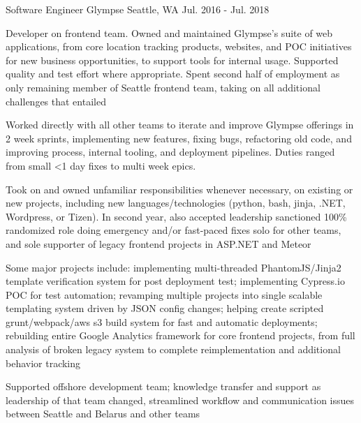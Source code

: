 \begin{cventries}
\cventry
{Software Engineer} %
{Glympse} %
{Seattle, WA} %
{Jul. 2016 - Jul. 2018} %
{
\begin{cvitems}
\item[] {Developer on frontend team. Owned and maintained Glympse's suite of web applications, from core location tracking products, websites, and POC initiatives for new business opportunities, to support tools for internal usage. Supported quality and test effort where appropriate. Spent second half of employment as only remaining member of Seattle frontend team, taking on all additional challenges that entailed}
\item[]
\item {Worked directly with all other teams to iterate and improve Glympse offerings in 2 week sprints, implementing new features, fixing bugs, refactoring old code, and improving process, internal tooling, and deployment pipelines. Duties ranged from small <1 day fixes to multi week epics. }
\item {Took on and owned unfamiliar responsibilities whenever necessary, on existing or new projects, including new languages/technologies (python, bash, jinja, .NET, Wordpress, or Tizen). In second year, also accepted leadership sanctioned 100\% randomized role doing emergency and/or fast-paced fixes solo for other teams, and sole supporter of legacy frontend projects in ASP.NET and Meteor}
\item {Some major projects include: implementing multi-threaded PhantomJS/Jinja2 template verification system for post deployment test; implementing Cypress.io POC for test automation; revamping multiple projects into single scalable templating system driven by JSON config changes; helping create scripted grunt/webpack/aws s3 build system for fast and automatic deployments; rebuilding entire Google Analytics framework for core frontend projects, from full analysis of broken legacy system to complete reimplementation and additional behavior tracking}
\item {Supported offshore development team; knowledge transfer and support as leadership of that team changed, streamlined workflow and communication issues between Seattle and Belarus and other teams}
\end{cvitems}
}


\end{cventries}
